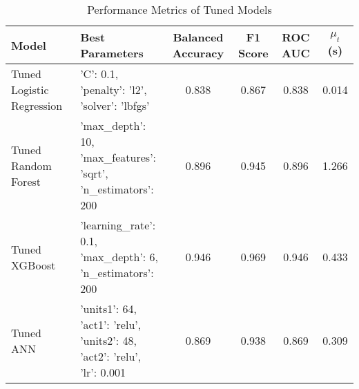\begin{table}[h!]
\centering
\caption{Performance Metrics of Tuned Models}
\label{tab:model_performance}
\begin{tabular}{llcccc}
\toprule
\textbf{Model} & \textbf{Best Parameters} & \textbf{Balanced Accuracy} & \textbf{F1 Score} & \textbf{ROC AUC} & $\mu_t$ (s) \\
\midrule
Tuned Logistic Regression & {'C': 0.1,\\ 'penalty': 'l2',\\ 'solver': 'lbfgs'} & 0.838 & 0.867 & 0.838 & 0.014 \\
Tuned Random Forest & {'max\_depth': 10,\\ 'max\_features': 'sqrt',\\ 'n\_estimators': 200} & 0.896 & 0.945 & 0.896 & 1.266 \\
Tuned XGBoost & {'learning\_rate': 0.1,\\ 'max\_depth': 6,\\ 'n\_estimators': 200} & 0.946 & 0.969 & 0.946 & 0.433 \\
Tuned ANN & {'units1': 64,\\ 'act1': 'relu',\\ 'units2': 48,\\ 'act2': 'relu',\\ 'lr': 0.001} & 0.869 & 0.938 & 0.869 & 0.309 \\
\bottomrule
\end{tabular}
\end{table}
